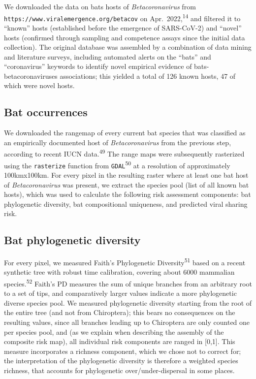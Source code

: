 \documentclass[11pt]{article}
\begin{document}
We downloaded the data on bats hosts of \emph{Betacoronavirus} from
\texttt{https://www.viralemergence.org/betacov} on
Apr.~2022,\textsuperscript{14} and filtered it to ``known'' hosts
(established before the emergence of SARS-CoV-2) and ``novel'' hosts
(confirmed through sampling and competence assays since the initial data
collection). The original database was assembled by a combination of
data mining and literature surveys, including automated alerts on the
``bats'' and ``coronavirus'' keywords to identify novel empirical
evidence of bats-betacoronaviruses associations; this yielded a total of
126 known hosts, 47 of which were novel hosts.

\hypertarget{bat-occurrences}{%
\subsection{Bat occurrences}\label{bat-occurrences}}

We downloaded the rangemap of every current bat species that was
classified as an empirically documented host of \emph{Betacoronavirus}
from the previous step, according to recent IUCN
data.\textsuperscript{49} The range maps were subsequently rasterized
using the \texttt{rasterize} function from
\texttt{GDAL}\textsuperscript{50} at a resolution of approximately
100kmx100km. For every pixel in the resulting raster where at least one
bat host of \emph{Betacoronavirus} was present, we extract the species
pool (list of all known bat hosts), which was used to calculate the
following risk assessment components: bat phylogenetic diversity, bat
compositional uniqueness, and predicted viral sharing risk.

\hypertarget{bat-phylogenetic-diversity}{%
\subsection{Bat phylogenetic
diversity}\label{bat-phylogenetic-diversity}}

For every pixel, we measured Faith's Phylogenetic
Diversity\textsuperscript{51} based on a recent synthetic tree with
robust time calibration, covering about 6000 mammalian
species.\textsuperscript{52} Faith's PD measures the sum of unique
branches from an arbitrary root to a set of tips, and comparatively
larger values indicate a more phylogenetic diverse species pool. We
measured phylogenetic diversity starting from the root of the entire
tree (and not from Chiroptera); this bears no consequences on the
resulting values, since all branches leading up to Chiroptera are only
counted one per species pool, and (as we explain when describing the
assembly of the composite risk map), all individual risk components are
ranged in {[}0,1{]}. This measure incorporates a richness component,
which we chose not to correct for; the interpretation of the
phylogenetic diversity is therefore a weighted species richness, that
accounts for phylogenetic over/under-dispersal in some places.
\end{document}
